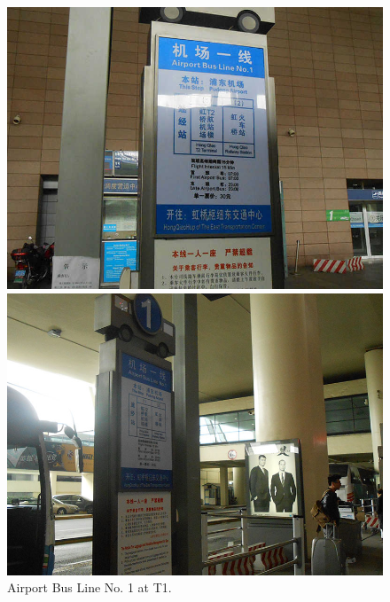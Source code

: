 \documentclass[11pt]{article}
\begin{document}
\begin{figure}[h]
	\begin{minipage}[t]{.5\textwidth}
     	\centering
        	\includegraphics{image005.jpg}
	\end{minipage}%
     \begin{minipage}[t]{.5\textwidth}
         \centering
         \includegraphics[scale=1.0]{image007.jpg}
    \end{minipage}%
	\caption{Airport Bus Line No. 1 at T1.\label{pic3}}
 \end{figure}
  
\end{document}
